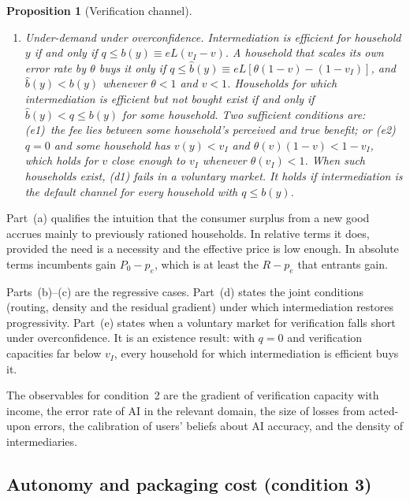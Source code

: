 \documentclass[12pt]{article}
\newtheorem{proposition}{Proposition}
\theoremstyle{remark}
\begin{document}
\begin{proposition}[Verification channel]
\begin{enumerate}[label=(\alph*),itemsep=1pt]
\[
n\ \ge\ n^*\equiv\frac{F}{(1-\eta)R(y_L)-p-m-e(1-v_I)L};
\]
and (d3)~the conditions of Lemma~\ref{lem:schedule} hold for the self-verifying households above the cutoff.
\item \emph{Under-demand under overconfidence.} Intermediation is efficient for household $y$ if and only if $q\le b(y)\equiv eL(v_I-v)$. A household that scales its own error rate by $\theta$ buys it only if $q\le\hat b(y)\equiv eL[\theta(1-v)-(1-v_I)]$, and $\hat b(y)<b(y)$ whenever $\theta<1$ and $v<1$. Households for which intermediation is efficient but not bought exist if and only if $\hat b(y)<q\le b(y)$ for some household. Two sufficient conditions are: (e1)~the fee lies between some household's perceived and true benefit; or (e2)~$q=0$ and some household has $v(y)<v_I$ and $\theta(v)(1-v)<1-v_I$, which holds for $v$ close enough to $v_I$ whenever $\theta(v_I)<1$. When such households exist, (d1) fails in a voluntary market. It holds if intermediation is the default channel for every household with $q\le b(y)$.
\end{enumerate}
\end{proposition}

Part~(a) qualifies the intuition that the consumer surplus from a new good accrues mainly to previously rationed households. In relative terms it does, provided the need is a necessity and the effective price is low enough. In absolute terms incumbents gain $P_0-p_e$, which is at least the $R-p_e$ that entrants gain.

Parts~(b)--(c) are the regressive cases. Part~(d) states the joint conditions (routing, density and the residual gradient) under which intermediation restores progressivity. Part~(e) states when a voluntary market for verification falls short under overconfidence. It is an existence result: with $q=0$ and verification capacities far below $v_I$, every household for which intermediation is efficient buys it.

The observables for condition~2 are the gradient of verification capacity with income, the error rate of AI in the relevant domain, the size of losses from acted-upon errors, the calibration of users' beliefs about AI accuracy, and the density of intermediaries.

\subsection{Autonomy and packaging cost (condition 3)}\label{sec:autonomy}
\end{document}
